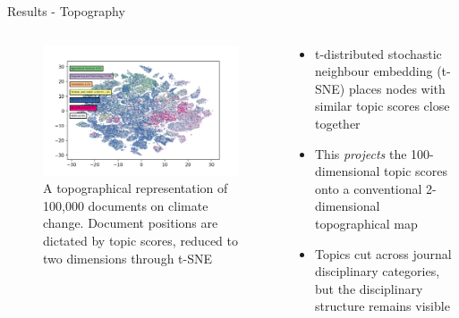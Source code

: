 \documentclass[9pt]{beamer}
\begin{document}
\begin{frame}{Results - Topography}

\begin{columns}
	\begin{column}{0.7\linewidth}
		\begin{figure}	
			\includegraphics[width=\linewidth]{../tsne_results/plots/run_662_s_100000_p30_oecds}
			\caption{A topographical representation of 100,000 documents on climate change. Document positions are dictated by topic scores, reduced to two dimensions through t-SNE}
		\end{figure}
	\end{column}
	\begin{column}{0.3\linewidth}	
		\begin{center}
			\begin{itemize}
				\item<2-> t-distributed stochastic neighbour embedding (t-SNE) \citep{vandermaaten2008} places nodes with similar topic scores close together
				\item<3-> This \textit{projects} the 100-dimensional topic scores onto a conventional 2-dimensional topographical map
				\item<4-> Topics cut across journal disciplinary categories, but the disciplinary structure remains visible
			\end{itemize}
		\end{center}
	\end{column}
\end{columns}

\end{frame}
\end{document}
